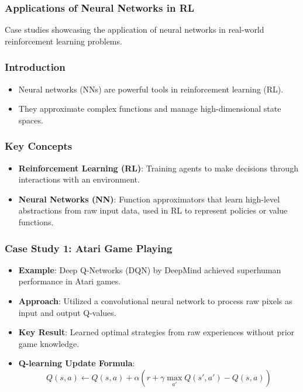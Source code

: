 \documentclass[aspectratio=169]{beamer}
\begin{document}
\begin{frame}
    \frametitle{Applications of Neural Networks in RL}
    Case studies showcasing the application of neural networks in real-world reinforcement learning problems.
\end{frame}

\begin{frame}
    \frametitle{Introduction}
    \begin{itemize}
        \item Neural networks (NNs) are powerful tools in reinforcement learning (RL).
        \item They approximate complex functions and manage high-dimensional state spaces.
    \end{itemize}
\end{frame}

\begin{frame}
    \frametitle{Key Concepts}
    \begin{itemize}
        \item \textbf{Reinforcement Learning (RL)}: Training agents to make decisions through interactions with an environment.
        \item \textbf{Neural Networks (NN)}: Function approximators that learn high-level abstractions from raw input data, used in RL to represent policies or value functions.
    \end{itemize}
\end{frame}

\begin{frame}
    \frametitle{Case Study 1: Atari Game Playing}
    \begin{itemize}
        \item \textbf{Example}: Deep Q-Networks (DQN) by DeepMind achieved superhuman performance in Atari games.
        \item \textbf{Approach}: Utilized a convolutional neural network to process raw pixels as input and output Q-values.
        \item \textbf{Key Result}: Learned optimal strategies from raw experiences without prior game knowledge.
        \item \textbf{Q-learning Update Formula}:
        \begin{equation}
            Q(s, a) \leftarrow Q(s, a) + \alpha \left( r + \gamma \max_{a'} Q(s', a') - Q(s, a) \right)
        \end{equation}
    \end{itemize}
\end{frame}
\end{document}
